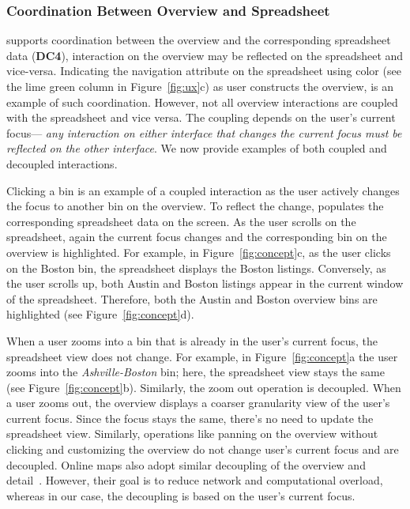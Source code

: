 \subsubsection{Coordination Between Overview and Spreadsheet}
\noah supports coordination
between the overview and the
corresponding spreadsheet data (\textbf{DC4}),
\ie interaction on the overview
may be reflected on the spreadsheet and vice-versa.
Indicating the navigation attribute on the spreadsheet
using color (see the lime green column in Figure~\ref{fig:ux}c)
as user constructs the overview, is an example of such coordination. However, not all overview interactions are coupled
with the spreadsheet and vice versa.
The coupling depends on the user's current
focus---\emph{ any interaction on
either interface
that changes the current focus must be reflected
on the other interface}.
We now provide examples of both
coupled and decoupled interactions.

Clicking a bin is an example of a coupled interaction
as the user actively changes the focus
to another bin on the overview.
To reflect the change, \noah populates
the corresponding spreadsheet data
on the screen.
As the user scrolls on the spreadsheet,
again the current focus changes
and the corresponding bin on the overview is highlighted.
For example, in Figure~\ref{fig:concept}c,
as the user clicks on the Boston bin,
the spreadsheet displays the Boston listings.
Conversely, as the user scrolls up,
both Austin and Boston listings appear in the current window of the spreadsheet.
Therefore, both the Austin and Boston overview
bins are highlighted
(see Figure~\ref{fig:concept}d).

When a user zooms into a bin
that is already in the user's current focus,
the spreadsheet view does not change.
For example, in Figure~\ref{fig:concept}a
the user zooms into the \emph{Ashville-Boston} bin;
here, the spreadsheet view stays the same
(see Figure~\ref{fig:concept}b).
Similarly, the zoom out operation is decoupled.
When a user zooms out,
the overview displays
a coarser granularity view
of the user's current focus.
Since the focus stays the same,
there's no need to update the spreadsheet view.
Similarly, operations like panning on the overview without clicking
and customizing the overview
do not change user's current focus and are decoupled.
Online maps also adopt similar
decoupling of the overview and detail~\cite{cockburn2009review}.
However, their goal is to reduce network
and computational overload, whereas in our case,
the decoupling is based on the user's current focus.


